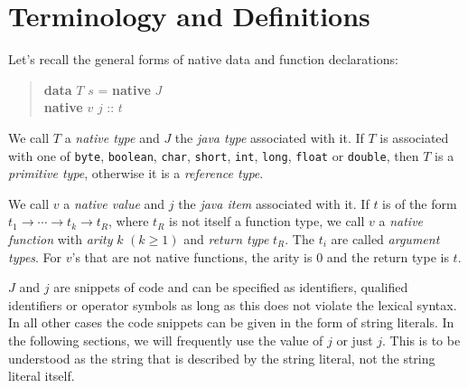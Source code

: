 \begin{description}
\end{description}

\section{Terminology and Definitions}

Let's recall the general forms of native data and function declarations:
\begin{quote}
\begin{flushleft}
\textbf{data} $T$ $s$ = \textbf{native} $J$\\
\textbf{native} $v$ $j$ :: $t$
\end{flushleft}
\end{quote}

We call $T$ a \emph{native type} and $J$ the \emph{java type} associated with it. If $T$ is associated with one of \texttt{byte}, \texttt{boolean}, \texttt{char}, \texttt{short}, \texttt{int}, \texttt{long}, \texttt{float} or \texttt{double}, then $T$ is a \emph{primitive type}, otherwise it is a  \emph{reference type}.

We call $v$ a \emph{native value} and $j$ the \emph{java item} associated with it. If $t$ is of the form $t_1 \rightarrow{} \cdots{} \rightarrow{} t_k \rightarrow{}t_R$, where $t_R$ is not itself a function type, we call $v$ a \emph{native function} with \emph{arity} $k$ $(k\ge 1)$ and \emph{return type} $t_R$. The $t_i$ are called \emph{argument types}. For $v$'s that are not native functions, the arity is 0 and the return type is $t$.

$J$ and $j$ are snippets of \java{} code and can be specified as identifiers, qualified identifiers or operator symbols as long as this does not violate the \frege{} lexical syntax. In all other cases the code snippets can be given in the form of string literals. In the following sections, we will frequently use the value of $j$ or just $j$. This is to be understood as the string that is described by the string literal, not the string literal itself.

